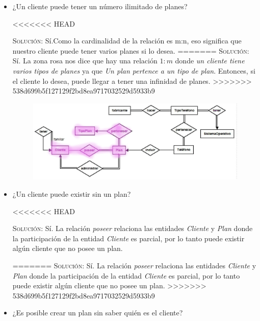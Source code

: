 \documentclass[letterpaper,11pt]{article}
\begin{document}
    \begin{itemize}
        \item ¿Un cliente puede tener un número ilimitado de planes?

<<<<<<< HEAD

    \textsc{Solución:} Sí.Como la cardinalidad de la relación es m:n, eso significa que nuestro cliente puede tener varios planes si lo desea.
=======
    \textsc{Solución:} Sí. La zona rosa nos dice que hay una relación $1:m$ 
    donde \textit{un cliente tiene varios tipos de planes} ya que 
    \textit{Un plan pertence a un tipo de plan}. Entonces, si el 
    cliente lo desea, puede llegar a tener una infinidad de planes.
>>>>>>> 538d699b5f127129f2bd8ea9717032529d5933b9

    \begin{figure}[h]
        \centering
        \includegraphics[scale=0.4]{./imagenes/modelo1.jpg}
    \end{figure}

    \item ¿Un cliente puede existir sin un plan?

<<<<<<< HEAD

    \textsc{Solución:} Sí. La relación \textit{poseer} relaciona las entidades \textit{Cliente} y \textit{Plan} donde la participación de la entidad \textit{Cliente} es parcial, por lo tanto puede existir algún cliente que no posee un plan.

=======
    \textsc{Solución:} Sí. La relación \textit{poseer} relaciona las entidades \textit{Cliente} y \textit{Plan} donde la participación de la entidad \textit{Cliente} es parcial, por lo tanto puede existir algún cliente que no posee un plan.
>>>>>>> 538d699b5f127129f2bd8ea9717032529d5933b9

    \item ¿Es posible crear un plan sin saber quién es el cliente?


\end{itemize}
\end{document}
